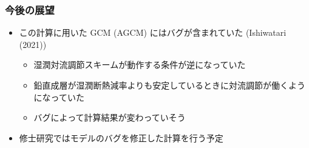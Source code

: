 \documentclass[aspectratio=149,9pt,fleqn]{beamer}
\begin{document}
\begin{frame}
	\frametitle{今後の展望}
	\begin{itemize}
		\item この計算に用いた GCM (AGCM) にはバグが含まれていた (Ishiwatari \etal (2021))
			\begin{itemize}
				\item 湿潤対流調節スキームが動作する条件が逆になっていた
				\item 鉛直成層が湿潤断熱減率よりも安定しているときに対流調節が働くようになっていた
				\item バグによって計算結果が変わっていそう
			\end{itemize}
		\item 修士研究ではモデルのバグを修正した計算を行う予定
	\end{itemize}
\end{frame}
\end{document}
